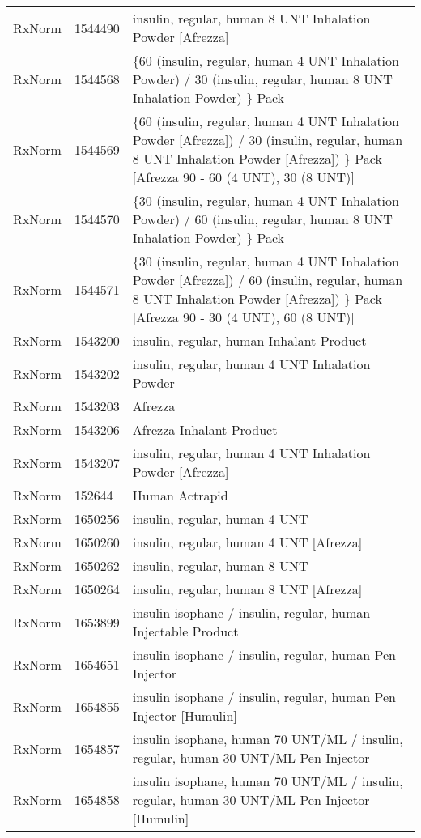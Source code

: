 \begin{longtable}{p{}p{}p{}}
  RxNorm & 1544490 & insulin, regular, human 8 UNT Inhalation Powder [Afrezza] \\ 
  RxNorm & 1544568 & \{60 (insulin, regular, human 4 UNT Inhalation Powder) / 30 (insulin, regular, human 8 UNT Inhalation Powder) \} Pack \\ 
  RxNorm & 1544569 & \{60 (insulin, regular, human 4 UNT Inhalation Powder [Afrezza]) / 30 (insulin, regular, human 8 UNT Inhalation Powder [Afrezza]) \} Pack [Afrezza 90 - 60 (4 UNT), 30 (8 UNT)] \\ 
  RxNorm & 1544570 & \{30 (insulin, regular, human 4 UNT Inhalation Powder) / 60 (insulin, regular, human 8 UNT Inhalation Powder) \} Pack \\ 
  RxNorm & 1544571 & \{30 (insulin, regular, human 4 UNT Inhalation Powder [Afrezza]) / 60 (insulin, regular, human 8 UNT Inhalation Powder [Afrezza]) \} Pack [Afrezza 90 - 30 (4 UNT), 60 (8 UNT)] \\ 
  RxNorm & 1543200 & insulin, regular, human Inhalant Product \\ 
  RxNorm & 1543202 & insulin, regular, human 4 UNT Inhalation Powder \\ 
  RxNorm & 1543203 & Afrezza \\ 
  RxNorm & 1543206 & Afrezza Inhalant Product \\ 
  RxNorm & 1543207 & insulin, regular, human 4 UNT Inhalation Powder [Afrezza] \\ 
  RxNorm & 152644 & Human Actrapid \\ 
  RxNorm & 1650256 & insulin, regular, human 4 UNT \\ 
  RxNorm & 1650260 & insulin, regular, human 4 UNT [Afrezza] \\ 
  RxNorm & 1650262 & insulin, regular, human 8 UNT \\ 
  RxNorm & 1650264 & insulin, regular, human 8 UNT [Afrezza] \\ 
  RxNorm & 1653899 & insulin isophane / insulin, regular, human Injectable Product \\ 
  RxNorm & 1654651 & insulin isophane / insulin, regular, human Pen Injector \\ 
  RxNorm & 1654855 & insulin isophane / insulin, regular, human Pen Injector [Humulin] \\ 
  RxNorm & 1654857 & insulin isophane, human 70 UNT/ML / insulin, regular, human 30 UNT/ML Pen Injector \\ 
  RxNorm & 1654858 & insulin isophane, human 70 UNT/ML / insulin, regular, human 30 UNT/ML Pen Injector [Humulin] \\ 

\end{longtable}
